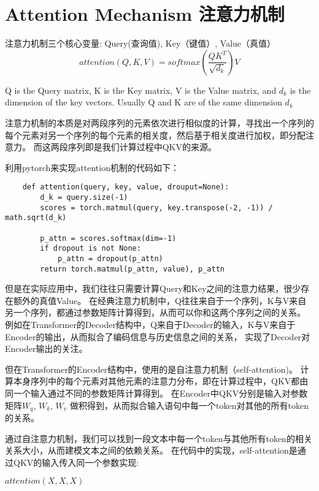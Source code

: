 \documentclass{article}
\begin{document}
\section{Attention Mechanism 注意力机制}

注意力机制三个核心变量: Query(查询值), Key（键值）, Value（真值）
\begin{equation}
    attention(Q,K,V) = softmax(\frac{QK^T}{\sqrt{d_k}})V
    \label{eq:attention}
\end{equation}

Q is the Query matrix, K is the Key matrix, V is the Value matrix, and $d_k$ is the dimension of the key vectors.
Usually Q and K are of the same dimension $d_k$

注意力机制的本质是对两段序列的元素依次进行相似度的计算，寻找出一个序列的每个元素对另一个序列的每个元素的相关度，然后基于相关度进行加权，即分配注意力。
而这两段序列即是我们计算过程中QKV的来源。

利用pytorch来实现attention机制的代码如下：

\begin{verbatim}
    def attention(query, key, value, drouput=None):
        d_k = query.size(-1)
        scores = torch.matmul(query, key.transpose(-2, -1)) / math.sqrt(d_k)

        p_attn = scores.softmax(dim=-1)
        if dropout is not None:
            p_attn = dropout(p_attn)
        return torch.matmul(p_attn, value), p_attn

\end{verbatim}

但是在实际应用中，我们往往只需要计算Query和Key之间的注意力结果，很少存在额外的真值Value。
在经典注意力机制中，Q往往来自于一个序列，K与V来自另一个序列，都通过参数矩阵计算得到，从而可以你和这两个序列之间的关系。
例如在Transformer的Decoder结构中，Q来自于Decoder的输入，K与V来自于Encoder的输出，从而拟合了编码信息与历史信息之间的关系，
实现了Decoder对Encoder输出的关注。

但在Transformer的Encoder结构中，使用的是自注意力机制（self-attention)。
计算本身序列中的每个元素对其他元素的注意力分布，即在计算过程中，QKV都由同一个输入通过不同的参数矩阵计算得到。
在Encoder中QKV分别是输入对参数矩阵$W_q$, $W_k$, $W_v$ 做积得到，从而拟合输入语句中每一个token对其他的所有token的关系。

通过自注意力机制，我们可以找到一段文本中每一个token与其他所有token的相关关系大小，从而建模文本之间的依赖关系。
在代码中的实现，self-attention是通过QKV的输入传入同一个参数实现:

$attention(X,X,X)$
\end{document}
